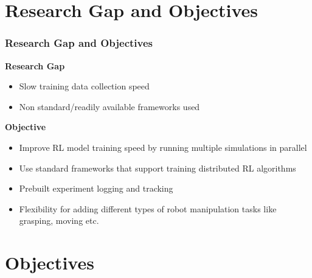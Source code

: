 \documentclass{beamer}
\begin{document}
	\section{Research Gap and Objectives}
	\begin{frame}
		\frametitle{Research Gap and Objectives}
		\textbf{Research Gap}
		\begin{itemize}
			\item Slow training data collection speed
			\item Non standard/readily available frameworks used
		\end{itemize}
		\vspace{1em}
		\textbf{Objective} \\
		\begin{itemize}
			\item Improve RL model training speed by running multiple simulations in parallel
			\item Use standard frameworks that support training distributed RL algorithms
			\item Prebuilt experiment logging and tracking
			\item Flexibility for adding different types of robot manipulation tasks like grasping, moving etc.
		\end{itemize}
	\end{frame}

	\section{Objectives}
\end{document}
